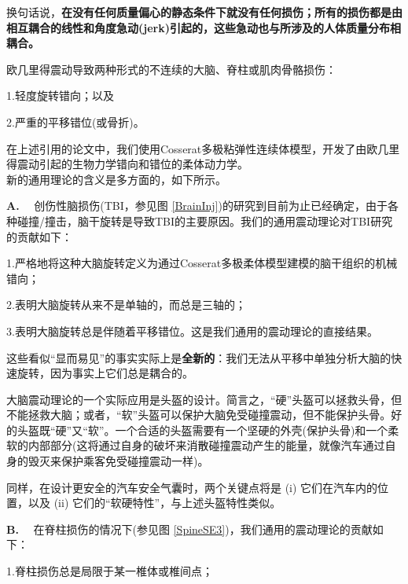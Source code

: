 \documentclass[11pt,fontset=founder]{ctexart}
\begin{document}
\noindent 换句话说，\textbf{在没有任何质量偏心的静态条件下就没有任何损伤；所有的损伤都是由相互耦合的线性和角度急动(jerk)引起的，这些急动也与所涉及的人体质量分布相耦合。}\newline


欧几里得震动导致两种形式的不连续的大脑、脊柱或肌肉骨骼损伤：

1.\quad 轻度旋转错向；以及

2.\quad 严重的平移错位(或骨折)。\newline

在上述引用的论文中，我们使用Cosserat多极粘弹性连续体模型，开发了由欧几里得震动引起的生物力学错向和错位的柔体动力学。\\

新的通用理论的含义是多方面的，如下所示。\newline

\noindent\textbf{A.} ~~创伤性脑损伤(TBI，参见图 \ref{BrainInj})的研究到目前为止已经确定，由于各种碰撞/撞击，脑干旋转是导致TBI的主要原因。我们的通用震动理论对TBI研究的贡献如下：\newline

1.\quad 严格地将这种大脑旋转定义为通过Cosserat多极柔体模型建模的脑干组织的机械错向；

2.\quad 表明大脑旋转从来不是单轴的，而总是三轴的；

3.\quad 表明大脑旋转总是伴随着平移错位。这是我们通用的震动理论的直接结果。\newline

这些看似“显而易见”的事实实际上是\textbf{全新的}：我们无法从平移中单独分析大脑的快速旋转，因为事实上它们总是耦合的。\newline

大脑震动理论的一个实际应用是头盔的设计。简言之，“硬”头盔可以拯救头骨，但不能拯救大脑；或者，“软”头盔可以保护大脑免受碰撞震动，但不能保护头骨。好的头盔既“硬”又“软”。一个合适的头盔需要有一个坚硬的外壳(保护头骨)和一个柔软的内部部分(这将通过自身的破坏来消散碰撞震动产生的能量，就像汽车通过自身的毁灭来保护乘客免受碰撞震动一样)。\newline

同样，在设计更安全的汽车安全气囊时，两个关键点将是 (i) 它们在汽车内的位置，以及 (ii) 它们的“软硬特性”，与上述头盔特性类似。\newline

\noindent\textbf{B.} ~~在脊柱损伤的情况下(参见图 \ref{SpineSE3})，我们通用的震动理论的贡献如下：\newline

1.\quad 脊柱损伤总是局限于某一椎体或椎间点；
\end{document}
